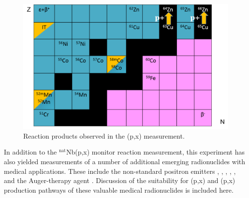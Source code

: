 \begin{figure}
 \centering
 \includegraphics[width=0.75\columnwidth]{./figures/ipf_cu_product_table.png}
 \caption{Reaction products observed in the (p,x) measurement.}
 \label{fig:ipf_cu_product_table}
\end{figure}






In addition to the $^\text{nat}$Nb(p,x) monitor reaction measurement, this experiment has also yielded measurements of  a number of additional  emerging radionuclides with medical applications.
These include the non-standard positron emitters 
 \cite{PMID:7632762,zweit1996medium,Graves2016,Rosch2014}, 
 \cite{Lewis2003,Bandari2014,mp500671j,Szelecsenyi1993,Aslam2009,Hilgers2003,Szelecsenyi2005,Voyles2017},   \cite{Valdovinos2017,Nickles2003,Qaim2008,QaimSyedM2011,Rosch1993,doi:10.1139/v67-193,levkovski1991cross,Johnson2015,Singh2013,Kiselev1974,Kandil2009}, 
  \cite{Verel2003,Dijkers2009,Dijkers2010,PhysRevC.38.1624,Omara2009},  
 \cite{Busse2002,Radchenko2012},  
and the Auger-therapy agent  \cite{Kovacs1991,Titarenko2011}. 
Discussion of the suitability for  (p,x) and (p,x) production pathways of these valuable medical radionuclides is included here. 


%
%

